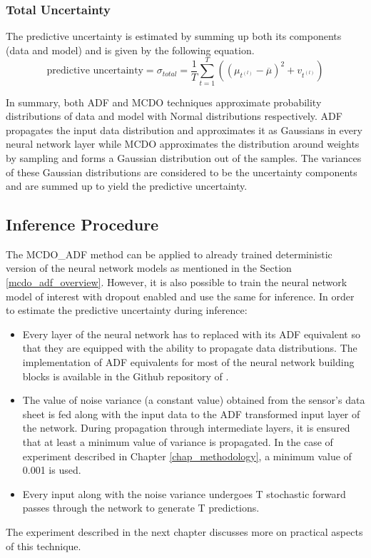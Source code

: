 	\subsubsection{Total Uncertainty}
	The predictive uncertainty is estimated by summing up both its components (data and model) and is given by the following equation.
	\begin{equation}
		\text{predictive uncertainty} = \sigma_{total} =  \frac{1}{T}\sum_{t=1}^{T}((\mu_{t^{(l)}}-\overline{\mu})^2 + v_{t^{(l)}})
	\end{equation}
	
	
	In summary, both ADF and MCDO techniques approximate probability distributions of data and model with Normal distributions respectively. ADF propagates the input data distribution and approximates it as Gaussians in every neural network layer while MCDO approximates the distribution around weights by sampling and forms a Gaussian distribution out of the samples. The variances of these Gaussian distributions are considered to be the uncertainty components and are summed up to yield the predictive uncertainty.
	
	\subsection{Inference Procedure}\label{sec_mcdo_adf}
	The MCDO\_ADF method can be applied to already trained deterministic version of the neural network models as mentioned in the Section \ref{mcdo_adf_overview}. However, it is also possible to train the neural network model of interest with dropout enabled and use the same for inference.
	In order to estimate the predictive uncertainty during inference:
	\begin{itemize}
		\item Every layer of the neural network has to replaced with its ADF equivalent so that they are equipped with the ability to propagate data distributions. The implementation of ADF equivalents for most of the neural network building blocks is available in the Github repository of \cite{gast2018lightweight}.
		\item The value of noise variance (a constant value) obtained from the sensor's data sheet is fed along with the input data to the ADF transformed input layer of the network. During propagation through intermediate layers, it is ensured that at least a minimum value of variance is propagated. In the case of experiment described in Chapter \ref{chap_methodology}, a minimum value of 0.001 is used.
		\item Every input along with the noise variance undergoes T stochastic forward passes through the network to generate T predictions.  
	\end{itemize}
	The experiment described in the next chapter discusses more on practical aspects of this technique.    
